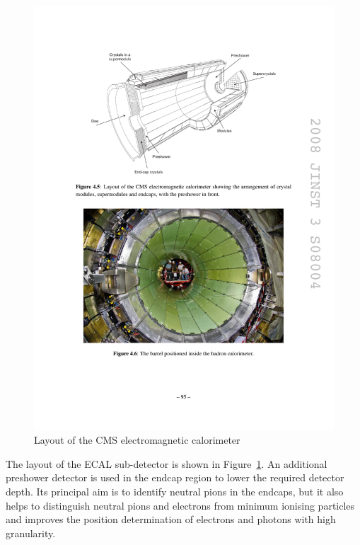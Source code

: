 \begin{figure}[!htbp]
  \centering
  \leavevmode
  \includegraphics[width=\columnwidth]{ECAL}
  \caption{Layout of the CMS electromagnetic calorimeter \autocite{CMS}}
  \label{fig:ECAL}
\end{figure}

The layout of the ECAL sub-detector is shown in Figure~\ref{fig:ECAL}. An additional preshower detector is used in the
endcap region to lower the required detector depth. Its principal aim is to identify neutral pions in the endcaps, but
it also helps to distinguish neutral pions and electrons from minimum ionising particles and improves the position
determination of electrons and photons with high granularity.



